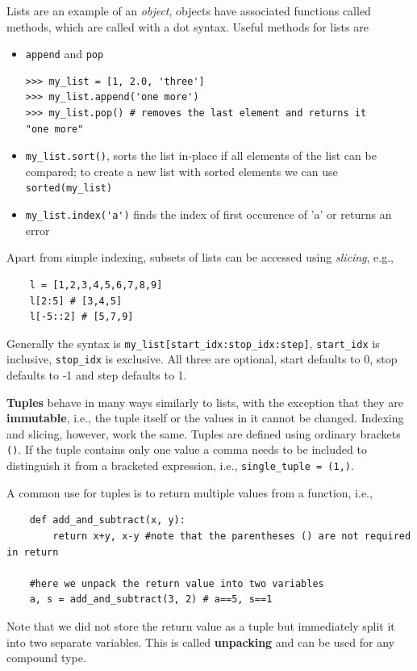 \documentclass{article}
\newcommand{\ls}[1]{\lstinline{#1}}
\newcounter{syntax}
\begin{document}
Lists are an example of an \emph{object}, objects have associated functions called methods, which are called with a dot syntax. Useful methods for lists are
\begin{itemize}
    \item \verb|append| and \verb|pop|
\begin{lstlisting}
>>> my_list = [1, 2.0, 'three']
>>> my_list.append('one more')
>>> my_list.pop() # removes the last element and returns it
"one more"
\end{lstlisting}
    \item \verb|my_list.sort()|, sorts the list in-place if all elements of the list can be compared; to create a new list with sorted elements we can use \verb|sorted(my_list)|
    \item \verb|my_list.index('a')| finds the index of first occurence of 'a' or returns an error
\end{itemize}

Apart from simple indexing, subsets of lists can be accessed using \emph{slicing}, e.g.,
\begin{lstlisting}
    l = [1,2,3,4,5,6,7,8,9]
    l[2:5] # [3,4,5]
    l[-5::2] # [5,7,9]
\end{lstlisting}
Generally the syntax is \verb|my_list[start_idx:stop_idx:step]|, \verb|start_idx| is inclusive, \verb|stop_idx| is exclusive. All three are optional, start defaults to 0, stop defaults to -1 and step defaults to 1.

\textbf{Tuples} behave in many ways similarly to lists, with the exception that they are \textbf{immutable}, i.e., the tuple itself or the values in it cannot be changed. Indexing and slicing, however, work the same. Tuples are defined using ordinary brackets \ls{()}. If the tuple contains only one value a comma needs to be included to distinguish it from a bracketed expression, i.e., \ls{single_tuple = (1,)}.

A common use for tuples is to return multiple values from a function, i.e.,
\begin{lstlisting}
    def add_and_subtract(x, y):
        return x+y, x-y #note that the parentheses () are not required in return

    #here we unpack the return value into two variables
    a, s = add_and_subtract(3, 2) # a==5, s==1
\end{lstlisting}
Note that we did not store the return value as a tuple but immediately split it into two separate variables. This is called \textbf{unpacking} and can be used for any compound type.
\end{document}
